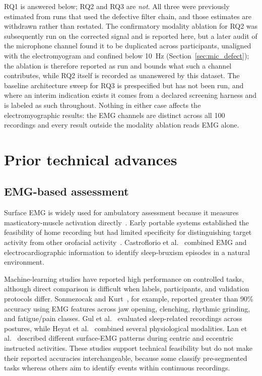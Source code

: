 \documentclass[pdflatex,sn-nature,iicol]{sn-jnl}
\begin{document}
RQ1 is answered below; RQ2 and RQ3 are \emph{not}. All three were previously estimated from runs that used the defective filter chain, and those estimates are withdrawn rather than restated. The confirmatory modality ablation for RQ2 was subsequently run on the corrected signal and is reported here, but a later audit of the microphone channel found it to be duplicated across participants, unaligned with the electromyogram and confined below 10~Hz (Section~\ref{sec:mic_defect}); the ablation is therefore reported as run and bounds what such a channel contributes, while RQ2 itself is recorded as unanswered by this dataset. The baseline architecture sweep for RQ3 is prespecified but has not been run, and where an interim indication exists it comes from a declared screening harness and is labeled as such throughout. Nothing in either case affects the electromyographic results: the EMG channels are distinct across all 100 recordings and every result outside the modality ablation reads EMG alone.

\section{Prior technical advances}

\subsection{EMG-based assessment}

Surface EMG is widely used for ambulatory assessment because it measures masticatory-muscle activation directly~\cite{raez2006techniques}. Early portable systems established the feasibility of home recording but had limited specificity for distinguishing target activity from other orofacial activity~\cite{stuginski2016detection}. Castroflorio et al.~\cite{castroflorio2013use} combined EMG and electrocardiographic information to identify sleep-bruxism episodes in a natural environment.

Machine-learning studies have reported high performance on controlled tasks, although direct comparison is difficult when labels, participants, and validation protocols differ. Sonmezocak and Kurt~\cite{sonmezocak2021detection}, for example, reported greater than 90\% accuracy using EMG features across jaw opening, clenching, rhythmic grinding, and fatigue/pain classes. Gul et al.~\cite{gul2024advanced} evaluated sleep-related recordings across postures, while Heyat et al.~\cite{heyat2020computational} combined several physiological modalities. Lan et al.~\cite{lan2022comparative} described different surface-EMG patterns during centric and eccentric instructed activities. These studies support technical feasibility but do not make their reported accuracies interchangeable, because some classify pre-segmented tasks whereas others aim to identify events within continuous recordings.
\end{document}
